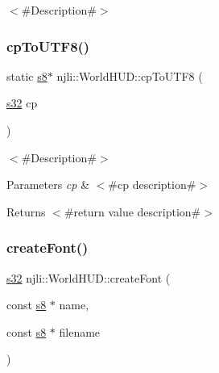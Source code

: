 $<$\#\+Description\#$>$ \mbox{\label{classnjli_1_1_world_h_u_d_ac3d6f31e35e126ffb9af9f16f286b708}} 
\subsubsection{\texorpdfstring{cp\+To\+U\+T\+F8()}{cpToUTF8()}}
{\footnotesize\ttfamily static \mbox{\hyperlink{_util_8h_a2ff401e087cf786c38a6812723e94473}{s8}}$\ast$ njli\+::\+World\+H\+U\+D\+::cp\+To\+U\+T\+F8 (\begin{DoxyParamCaption}\item[{\mbox{\hyperlink{_util_8h_aa62c75d314a0d1f37f79c4b73b2292e2}{s32}}}]{cp }\end{DoxyParamCaption})\hspace{0.3cm}{\ttfamily [static]}}

$<$\#\+Description\#$>$


\begin{DoxyParams}{Parameters}
{\em cp} & $<$\#cp description\#$>$\\
\hline
\end{DoxyParams}
\begin{DoxyReturn}{Returns}
$<$\#return value description\#$>$ 
\end{DoxyReturn}
\mbox{\label{classnjli_1_1_world_h_u_d_a06b9f9f91b0a3429f728a9064dd5e2c7}} 
\subsubsection{\texorpdfstring{create\+Font()}{createFont()}}
{\footnotesize\ttfamily \mbox{\hyperlink{_util_8h_aa62c75d314a0d1f37f79c4b73b2292e2}{s32}} njli\+::\+World\+H\+U\+D\+::create\+Font (\begin{DoxyParamCaption}\item[{const \mbox{\hyperlink{_util_8h_a2ff401e087cf786c38a6812723e94473}{s8}} $\ast$}]{name,  }\item[{const \mbox{\hyperlink{_util_8h_a2ff401e087cf786c38a6812723e94473}{s8}} $\ast$}]{filename }\end{DoxyParamCaption})}

